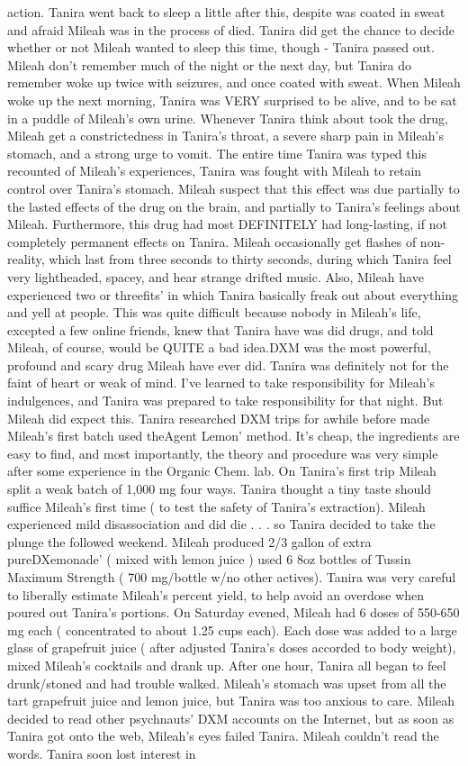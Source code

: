 \documentclass[12pt]{book}
\begin{document}
action. Tanira went back to sleep a little after this, despite was coated in sweat and afraid Mileah was in the process of died. Tanira did get the chance to decide whether or not Mileah wanted to sleep this time, though - Tanira passed out. Mileah don't remember much of the night or the next day, but Tanira do remember woke up twice with seizures, and once coated with sweat. When Mileah woke up the next morning, Tanira was VERY surprised to be alive, and to be sat in a puddle of Mileah's own urine. Whenever Tanira think about took the drug, Mileah get a constrictedness in Tanira's throat, a severe sharp pain in Mileah's stomach, and a strong urge to vomit. The entire time Tanira was typed this recounted of Mileah's experiences, Tanira was fought with Mileah to retain control over Tanira's stomach. Mileah suspect that this effect was due partially to the lasted effects of the drug on the brain, and partially to Tanira's feelings about Mileah. Furthermore, this drug had most DEFINITELY had long-lasting, if not completely permanent effects on Tanira. Mileah occasionally get flashes of non-reality, which last from three seconds to thirty seconds, during which Tanira feel very lightheaded, spacey, and hear strange drifted music. Also, Mileah have experienced two or threefits' in which Tanira basically freak out about everything and yell at people. This was quite difficult because nobody in Mileah's life, excepted a few online friends, knew that Tanira have was did drugs, and told Mileah, of course, would be QUITE a bad idea.DXM was the most powerful, profound and scary drug Mileah have ever did. Tanira was definitely not for the faint of heart or weak of mind. I've learned to take responsibility for Mileah's indulgences, and Tanira was prepared to take responsibility for that night. But Mileah did expect this. Tanira researched DXM trips for awhile before made Mileah's first batch used theAgent Lemon' method. It's cheap, the ingredients are easy to find, and most importantly, the theory and procedure was very simple after some experience in the Organic Chem. lab. On Tanira's first trip Mileah split a weak batch of 1,000 mg four ways. Tanira thought a tiny taste should suffice Mileah's first time ( to test the safety of Tanira's extraction). Mileah experienced mild disassociation and did die . . .  so Tanira decided to take the plunge the followed weekend. Mileah produced 2/3 gallon of extra pureDXemonade' ( mixed with lemon juice ) used 6 8oz bottles of Tussin Maximum Strength ( 700 mg/bottle w/no other actives). Tanira was very careful to liberally estimate Mileah's percent yield, to help avoid an overdose when poured out Tanira's portions. On Saturday evened, Mileah had 6 doses of 550-650 mg each ( concentrated to about 1.25 cups each). Each dose was added to a large glass of grapefruit juice ( after adjusted Tanira's doses accorded to body weight), mixed Mileah's cocktails and drank up. After one hour, Tanira all began to feel drunk/stoned and had trouble walked. Mileah's stomach was upset from all the tart grapefruit juice and lemon juice, but Tanira was too anxious to care. Mileah decided to read other psychnauts' DXM accounts on the Internet, but as soon as Tanira got onto the web, Mileah's eyes failed Tanira. Mileah couldn't read the words. Tanira soon lost interest in 
\end{document}
